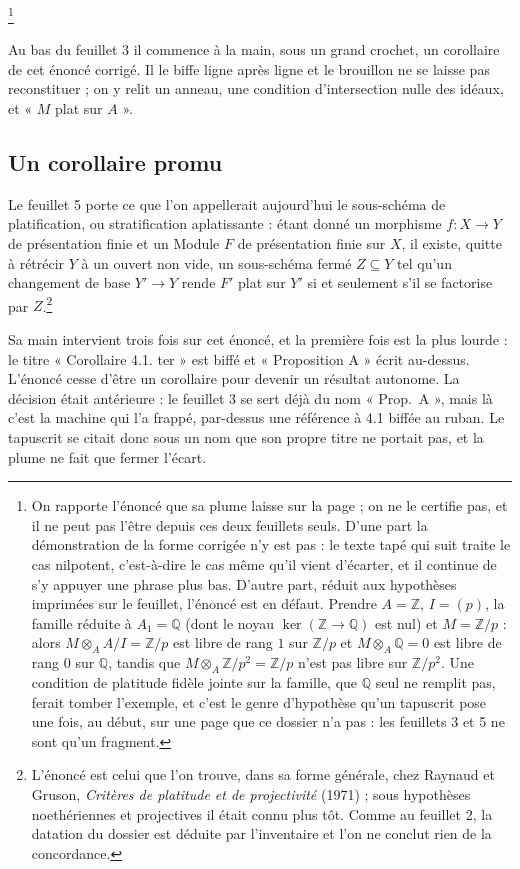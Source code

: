 \documentclass[11pt,a4paper]{article}
\begin{document}
\footnote{On rapporte l'énoncé que sa plume laisse sur la page ; on ne le
certifie pas, et il ne peut pas l'être depuis ces deux feuillets seuls. D'une
part la démonstration de la forme corrigée n'y est pas : le texte tapé qui suit
traite le cas nilpotent, c'est-à-dire le cas même qu'il vient d'écarter, et il
continue de s'y appuyer une phrase plus bas. D'autre part, réduit aux
hypothèses imprimées sur le feuillet, l'énoncé est en défaut. Prendre
$A = \mathbb{Z}$, $I = (p)$, la famille réduite à $A_1 = \mathbb{Q}$ (dont le
noyau $\ker(\mathbb{Z} \to \mathbb{Q})$ est nul) et $M = \mathbb{Z}/p$ : alors
$M \otimes_A A/I = \mathbb{Z}/p$ est libre de rang $1$ sur $\mathbb{Z}/p$ et
$M \otimes_A \mathbb{Q} = 0$ est libre de rang $0$ sur $\mathbb{Q}$, tandis que
$M \otimes_A \mathbb{Z}/p^2 = \mathbb{Z}/p$ n'est pas libre sur
$\mathbb{Z}/p^2$. Une condition de platitude fidèle jointe sur la famille, que
$\mathbb{Q}$ seul ne remplit pas, ferait tomber l'exemple, et c'est le genre
d'hypothèse qu'un tapuscrit pose une fois, au début, sur une page que ce
dossier n'a pas : les feuillets 3 et 5 ne sont qu'un fragment.}

Au bas du feuillet 3 il commence à la main, sous un grand crochet, un
corollaire de cet énoncé corrigé. Il le biffe ligne après ligne et le
brouillon ne se laisse pas reconstituer ; on y relit un anneau, une condition
d'intersection nulle des idéaux, et « $M$ plat sur $A$ ».

\subsection*{Un corollaire promu}

Le feuillet 5 porte ce que l'on appellerait aujourd'hui le sous-schéma de
platification, ou stratification aplatissante : étant donné un morphisme
$f : X \to Y$ de présentation finie et un Module $F$ de présentation finie sur
$X$, il existe, quitte à rétrécir $Y$ à un ouvert non vide, un sous-schéma
fermé $Z \subseteq Y$ tel qu'un changement de base $Y' \to Y$ rende $F'$ plat
sur $Y'$ si et seulement s'il se factorise par $Z$.\footnote{L'énoncé est celui
que l'on trouve, dans sa forme générale, chez Raynaud et Gruson, \emph{Critères
de platitude et de projectivité} (1971) ; sous hypothèses noethériennes et
projectives il était connu plus tôt. Comme au feuillet 2, la datation du
dossier est déduite par l'inventaire et l'on ne conclut rien de la
concordance.}

Sa main intervient trois fois sur cet énoncé, et la première fois est la plus
lourde : le titre « Corollaire 4.1. ter » est biffé et « Proposition A » écrit
au-dessus. L'énoncé cesse d'être un corollaire pour devenir un résultat
autonome. La décision était antérieure : le feuillet 3 se sert
déjà du nom « Prop.\ A », mais là c'est la machine qui l'a frappé, par-dessus
une référence à 4.1 biffée au ruban. Le tapuscrit se citait donc sous un nom
que son propre titre ne portait pas, et la plume ne fait que fermer l'écart.
\end{document}
